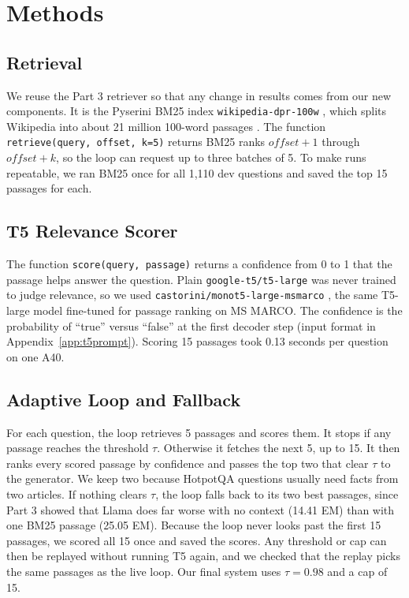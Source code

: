 \documentclass[11pt,twocolumn]{article}
\begin{document}
\section{Methods}

\subsection{Retrieval}
\label{sec:retrieval}

We reuse the Part 3 retriever so that any change in results comes from our new components. It is the Pyserini BM25 index \texttt{wikipedia-dpr-100w} \citep{lin2021pyserini}, which splits Wikipedia into about 21 million 100-word passages \citep{karpukhin2020dpr}. The function \texttt{retrieve(query, offset, k=5)} returns BM25 ranks $\textit{offset}+1$ through $\textit{offset}+k$, so the loop can request up to three batches of 5. To make runs repeatable, we ran BM25 once for all 1,110 dev questions and saved the top 15 passages for each.

\subsection{T5 Relevance Scorer}
\label{sec:scorer}

The function \texttt{score(query, passage)} returns a confidence from 0 to 1 that the passage helps answer the question. Plain \texttt{google-t5/t5-large} was never trained to judge relevance, so we used \texttt{castorini/monot5-large-msmarco} \citep{nogueira2020monot5}, the same T5-large model \citep{raffel2020t5} fine-tuned for passage ranking on MS MARCO. The confidence is the probability of ``true'' versus ``false'' at the first decoder step (input format in Appendix~\ref{app:t5prompt}). Scoring 15 passages took 0.13 seconds per question on one A40.

\subsection{Adaptive Loop and Fallback}
\label{sec:loop}

For each question, the loop retrieves 5 passages and scores them. It stops if any passage reaches the threshold $\tau$. Otherwise it fetches the next 5, up to 15. It then ranks every scored passage by confidence and passes the top two that clear $\tau$ to the generator. We keep two because HotpotQA questions usually need facts from two articles. If nothing clears $\tau$, the loop falls back to its two best passages, since Part 3 showed that Llama does far worse with no context (14.41 EM) than with one BM25 passage (25.05 EM). Because the loop never looks past the first 15 passages, we scored all 15 once and saved the scores. Any threshold or cap can then be replayed without running T5 again, and we checked that the replay picks the same passages as the live loop. Our final system uses $\tau=0.98$ and a cap of 15.
\end{document}
